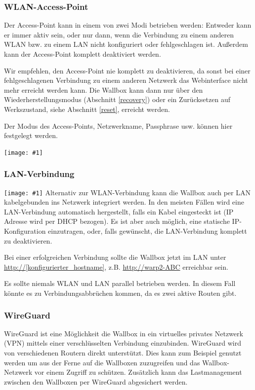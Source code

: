 \documentclass[a4paper,10pt]{article}
\newcommand{\hint}[1]{\begin{tcolorbox}[colback=boxgray,colframe=black,coltext=
white,title=Hinweis,left*=2mm,right*=2mm,boxsep=1mm,bottom=1mm,top=1mm]#1\end{tcolorbox}}
\newcommand{\gfx}[1]{\texttt{[image: \#1]}}
\begin{document}
\begin{multicols*}{2}
    \vspace{-0.4cm}
    \subsubsection{WLAN-Access-Point}
    \vspace{-0.1cm}
    Der Access-Point kann in einem von zwei Modi betrieben werden: Entweder kann er immer aktiv sein,
    oder nur dann, wenn die Verbindung zu einem anderen WLAN bzw. zu einem LAN nicht konfiguriert oder fehlgeschlagen ist.
    Außerdem kann der Access-Point komplett deaktiviert werden.
    \hint{Wir empfehlen, den Access-Point nie komplett zu deaktivieren, da sonst bei einer
        fehlgeschlagenen Verbindung zu einem anderen Netzwerk das Webinterface nicht mehr erreicht
        werden kann. Die Wallbox kann dann nur über den Wiederherstellungsmodus
        (Abschnitt \ref{recovery}) oder ein Zurücksetzen auf Werkszustand, siehe Abschnitt \ref{reset}, erreicht werden.}

    Der Modus des Access-Points, Netzwerkname, Passphrase usw. können hier festgelegt werden.

    \gfx{./img_warp2/resized/web_wifi_ap}

    \subsubsection{LAN-Verbindung}
    \gfx{./img_warp2/resized/web_ethernet}
    Alternativ zur WLAN-Verbindung kann die Wallbox auch per LAN kabelgebunden
    ins Netzwerk integriert werden. In den meisten Fällen wird eine
    LAN-Verbindung automatisch hergestellt, falls ein Kabel eingesteckt ist
    (IP Adresse wird per DHCP bezogen). Es ist aber auch möglich,
    eine statische IP-Konfiguration    einzutragen, oder, falls gewünscht, die LAN-Verbindung
    komplett zu deaktivieren.

    Bei einer erfolgreichen Verbindung sollte die Wallbox jetzt im LAN unter
    \url{http://[konfigurierter_hostname]}, z.B. \url{http://warp2-ABC} erreichbar sein.

    \hint{Es sollte niemals WLAN und LAN parallel betrieben werden. In diesem
    Fall könnte es zu Verbindungsabbrüchen kommen, da es zwei aktive Routen
    gibt.}

    \subsubsection{WireGuard}

    WireGuard ist eine Möglichkeit die Wallbox in ein virtuelles privates Netzwerk (VPN)
    mittels einer verschlüsselten Verbindung einzubinden. WireGuard wird von
    verschiedenen Routern direkt unterstützt. Dies kann zum Beispiel genutzt
    werden um aus der Ferne auf die Wallboxen zuzugreifen und das
    Wallbox-Netzwerk vor einem Zugriff zu schützen. Zusätzlich kann das
    Lastmanagement zwischen den Wallboxen per WireGuard abgesichert werden.


\end{multicols*}
\end{document}
